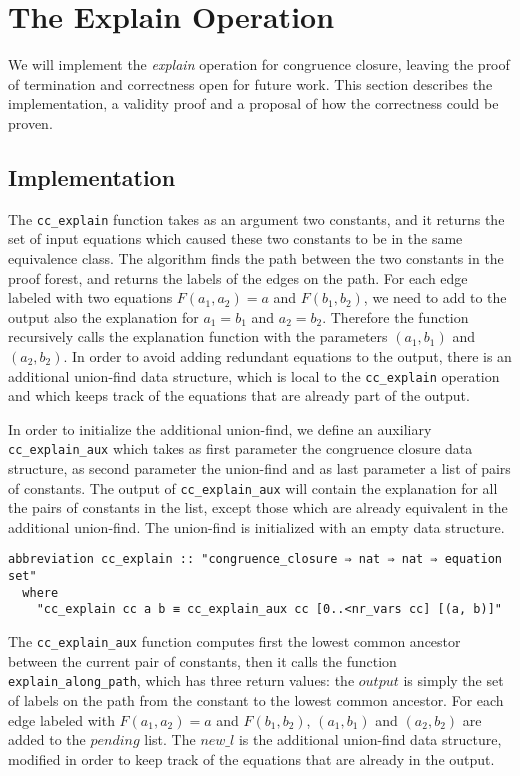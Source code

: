 \section{The Explain Operation}

We will implement the \emph{explain} operation for congruence closure, leaving the proof of termination and correctness open for future work.  This section describes the implementation, a validity proof and a proposal of how the correctness could be proven.


\subsection{Implementation}

The \lstinline{cc_explain} function takes as an argument two constants, and it returns the set of input equations which caused these two constants to be in the same equivalence class. The algorithm finds the path between the two constants in the proof forest, and returns the labels of the edges on the path. For each edge labeled with two equations $F(a_1, a_2) = a$ and $F(b_1, b_2)$, we need to add to the output also the explanation for $a_1 = b_1$ and $a_2 = b_2$. Therefore the function recursively calls the explanation function with the parameters $(a_1, b_1)$ and $(a_2, b_2)$. In order to avoid adding redundant equations to the output, there is an additional union-find data structure, which is local to the \lstinline{cc_explain} operation and which keeps track of the equations that are already part of the output.

In order to initialize the additional union-find, we define an auxiliary \lstinline{cc_explain_aux} which takes as first parameter the congruence closure data structure, as second parameter the union-find and as last parameter a list of pairs of constants. The output of \lstinline{cc_explain_aux} will contain the explanation for all the pairs of constants in the list, except those which are already equivalent in the additional union-find. The union-find is initialized with an empty data structure.

\begin{lstlisting}
abbreviation cc_explain :: "congruence_closure ⇒ nat ⇒ nat ⇒ equation set"
  where
    "cc_explain cc a b ≡ cc_explain_aux cc [0..<nr_vars cc] [(a, b)]"
\end{lstlisting}

The \lstinline{cc_explain_aux} function computes first the lowest common ancestor between the current pair of constants, then it calls the function \lstinline{explain_along_path}, which has three return values: the $output$ is simply the set of labels on the path from the constant to the lowest common ancestor. For each edge labeled with $F(a_1, a_2) = a$ and $F(b_1, b_2)$,  $(a_1, b_1)$ and $(a_2, b_2)$ are added to the $pending$ list. The $new\_l$ is the additional union-find data structure, modified in order to keep track of the equations that are already in the output.

